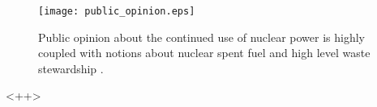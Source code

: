 
\begin{figure}[htbp!]
  \begin{center}
    \texttt{[image: public\_opinion.eps]}
  \end{center}
  \caption{Public opinion about the continued use of nuclear power is highly 
  coupled with notions about nuclear spent fuel and high level waste stewardship 
  \cite{public_opinion}.}
  \label{fig:<+label+>}
\end{figure}<++>
